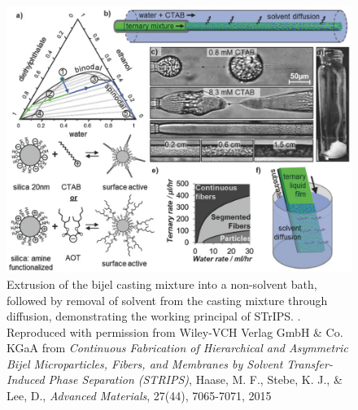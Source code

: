 \begin{figure}
    \centering
    \includegraphics[scale = 5]{figures/introduction/STrIPS.jpg}
    \caption{Extrusion of the bijel casting mixture into a non-solvent bath, followed by removal of solvent from 
             the casting mixture through diffusion, demonstrating the working principal of STrIPS. \cite{haase_continuous_2015}. Reproduced with permission from Wiley-VCH Verlag GmbH 
             \& Co. KGaA from \textit{Continuous Fabrication of Hierarchical and Asymmetric Bijel Microparticles, Fibers, and Membranes by 
             Solvent Transfer-Induced Phase Separation (STRIPS)}, Haase, M. F., Stebe, K. J., 
             \& Lee, D., \textit{Advanced Materials}, 27(44), 7065-7071, 2015}
    \label{fig:strips}
\end{figure}


